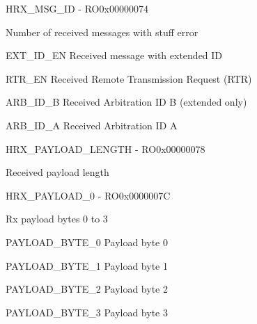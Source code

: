 \documentclass{article}
\begin{document}
\begin{register}{H}{RX{\_}MSG{\_}ID - RO}{0x00000074}  \par Number of received messages with stuff error \regnewline
  \label{RX_MSG_ID}
\regnewline
  \begin{regdesc}\begin{reglist}[EXT{\_}ID{\_}EN]
    \item [EXT{\_}ID{\_}EN] Received message with extended ID    \item [RTR{\_}EN] Received Remote Transmission Request (RTR)    \item [ARB{\_}ID{\_}B] Received Arbitration ID B (extended only)    \item [ARB{\_}ID{\_}A] Received Arbitration ID A  \end{reglist}\end{regdesc}
\end{register}

\begin{register}{H}{RX{\_}PAYLOAD{\_}LENGTH - RO}{0x00000078}  \par Received payload length \regnewline
  \label{RX_PAYLOAD_LENGTH}
\regnewline
\end{register}

\begin{register}{H}{RX{\_}PAYLOAD{\_}0 - RO}{0x0000007C}  \par Rx payload bytes 0 to 3 \regnewline
  \label{RX_PAYLOAD_0}
\regnewline
  \begin{regdesc}\begin{reglist}
    \item [PAYLOAD{\_}BYTE{\_}0] Payload byte 0    \item [PAYLOAD{\_}BYTE{\_}1] Payload byte 1    \item [PAYLOAD{\_}BYTE{\_}2] Payload byte 2    \item [PAYLOAD{\_}BYTE{\_}3] Payload byte 3  \end{reglist}\end{regdesc}
\end{register}
\end{document}
